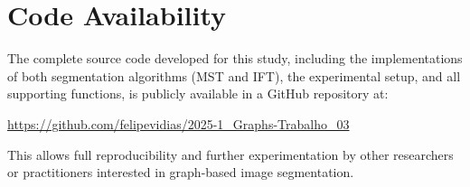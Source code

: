 \documentclass{sbc2023}
\begin{document}
\section*{Code Availability}
\label{sec:code_availability}

The complete source code developed for this study, including the implementations of both segmentation algorithms (MST and IFT), the experimental setup, and all supporting functions, is publicly available in a GitHub repository at:

\url{https://github.com/felipevidias/2025-1_Graphs-Trabalho_03}

This allows full reproducibility and further experimentation by other researchers or practitioners interested in graph-based image segmentation.


\nocite{*} %
\printbibliography[title={References}] %
\end{document}
